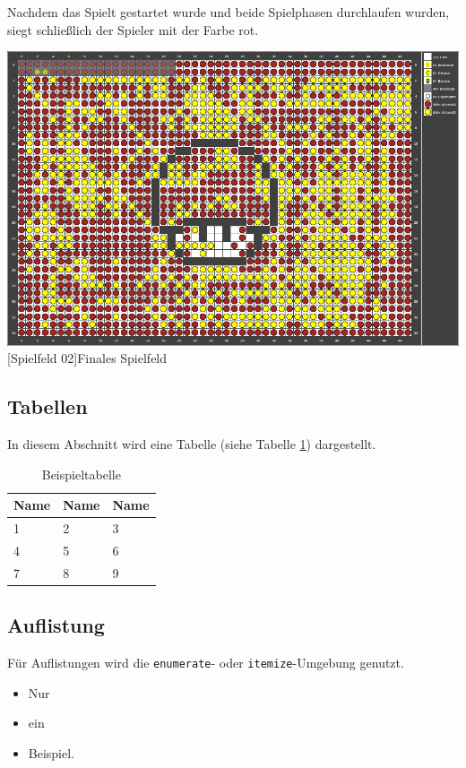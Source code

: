 \documentclass[12pt,a4paper,bibliography=totocnumbered,listof=totocnumbered]{article}
\begin{document}
Nachdem das Spielt gestartet wurde und beide Spielphasen durchlaufen wurden, siegt schließlich der Spieler mit der Farbe rot.

\vspace{1em}
\begin{minipage}{\linewidth}
	\centering
	\includegraphics[width=0.6\linewidth]{pics/gamefield02.png}
	[Spielfeld 02]{Finales Spielfeld\footnotemark }
	\label{fig:reversi2}
\end{minipage}

\subsection{Tabellen}
In diesem Abschnitt wird eine Tabelle (siehe Tabelle \ref{tab:beispiel}) dargestellt.

\vspace{1em}
\begin{table}[!h]
	\centering
	\begin{tabular}{|l|l|l|}
		\hline
		\textbf{Name} & \textbf{Name} & \textbf{Name}\\
		\hline
		1 & 2 & 3\\
		\hline
		4 & 5 & 6\\
		\hline
		7 & 8 & 9\\
		\hline
	\end{tabular}
	\caption{Beispieltabelle}
	\label{tab:beispiel}
\end{table}


\subsection{Auflistung}
Für Auflistungen wird die \texttt{enumerate}- oder \texttt{itemize}-Umgebung genutzt.

\begin{itemize}
	\item Nur
	\item ein
	\item Beispiel.
\end{itemize}
\end{document}
